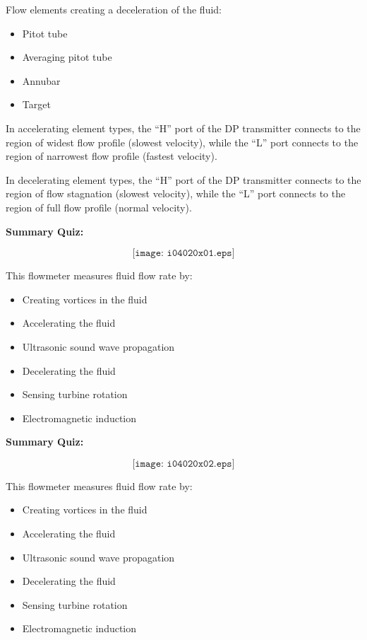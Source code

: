 \vskip 10pt

Flow elements creating a deceleration of the fluid:

\begin{itemize}
\item{} Pitot tube
\item{} Averaging pitot tube
\item{} Annubar
\item{} Target
\end{itemize}

\vskip 10pt

In accelerating element types, the ``H'' port of the DP transmitter connects to the region of widest flow profile (slowest velocity), while the ``L'' port connects to the region of narrowest flow profile (fastest velocity).

\vskip 10pt

In decelerating element types, the ``H'' port of the DP transmitter connects to the region of flow stagnation (slowest velocity), while the ``L'' port connects to the region of full flow profile (normal velocity).





\vfil \eject

\noindent
{\bf Summary Quiz:}

$$\texttt{[image: i04020x01.eps]}$$

\noindent
This flowmeter measures fluid flow rate by:

\begin{itemize}
\item{} Creating vortices in the fluid
\vskip 5pt 
\item{} Accelerating the fluid
\vskip 5pt 
\item{} Ultrasonic sound wave propagation
\vskip 5pt 
\item{} Decelerating the fluid
\vskip 5pt 
\item{} Sensing turbine rotation
\vskip 5pt 
\item{} Electromagnetic induction
\end{itemize}

\vfil \eject

\noindent
{\bf Summary Quiz:}

$$\texttt{[image: i04020x02.eps]}$$

\noindent
This flowmeter measures fluid flow rate by:

\begin{itemize}
\item{} Creating vortices in the fluid
\vskip 5pt 
\item{} Accelerating the fluid
\vskip 5pt 
\item{} Ultrasonic sound wave propagation
\vskip 5pt 
\item{} Decelerating the fluid
\vskip 5pt 
\item{} Sensing turbine rotation
\vskip 5pt 
\item{} Electromagnetic induction
\end{itemize}





